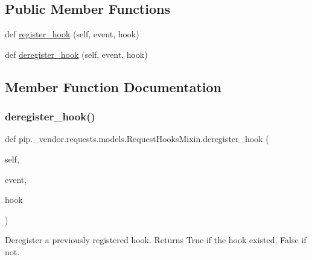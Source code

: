 \subsection*{Public Member Functions}
\begin{DoxyCompactItemize}
\item 
def \hyperlink{classpip_1_1__vendor_1_1requests_1_1models_1_1RequestHooksMixin_a904fbd85c2d0b9bb7edbe7e16db1aaa4}{register\+\_\+hook} (self, event, hook)
\item 
def \hyperlink{classpip_1_1__vendor_1_1requests_1_1models_1_1RequestHooksMixin_a133f293cbd172208a00269550b558e75}{deregister\+\_\+hook} (self, event, hook)
\end{DoxyCompactItemize}


\subsection{Member Function Documentation}
\mbox{\label{classpip_1_1__vendor_1_1requests_1_1models_1_1RequestHooksMixin_a133f293cbd172208a00269550b558e75}} 
\subsubsection{\texorpdfstring{deregister\+\_\+hook()}{deregister\_hook()}}
{\footnotesize\ttfamily def pip.\+\_\+vendor.\+requests.\+models.\+Request\+Hooks\+Mixin.\+deregister\+\_\+hook (\begin{DoxyParamCaption}\item[{}]{self,  }\item[{}]{event,  }\item[{}]{hook }\end{DoxyParamCaption})}

\begin{DoxyVerb}Deregister a previously registered hook.
Returns True if the hook existed, False if not.
\end{DoxyVerb}
 \mbox{\label{classpip_1_1__vendor_1_1requests_1_1models_1_1RequestHooksMixin_a904fbd85c2d0b9bb7edbe7e16db1aaa4}} 
